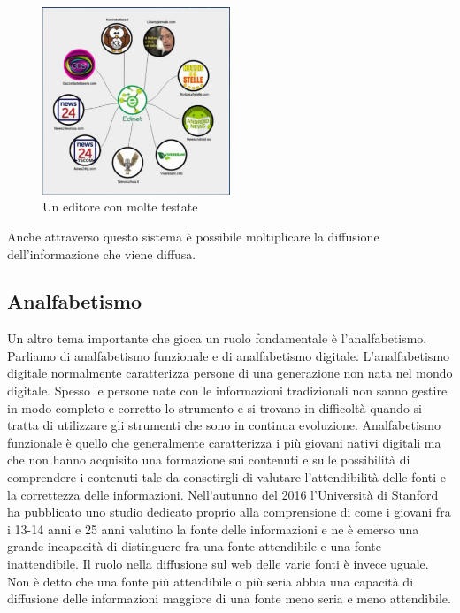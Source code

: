 \begin{figure}[h]
    \centering
    \includegraphics[width=0.5\textwidth]{images/10_lez_fig_01.jpg}
    \caption{Un editore con molte testate}
    \label{fig:editore_testate}
\end{figure}

Anche attraverso questo sistema è possibile moltiplicare la diffusione dell'informazione che viene diffusa. 

\subsection{Analfabetismo}

Un altro tema importante che gioca un ruolo fondamentale è l'analfabetismo. Parliamo di analfabetismo funzionale e di analfabetismo digitale. 
L'analfabetismo digitale normalmente caratterizza persone di una generazione non nata nel mondo digitale. Spesso le persone nate con le informazioni tradizionali non sanno gestire in modo completo e corretto lo strumento e si trovano in difficoltà quando si tratta di utilizzare gli strumenti che sono in continua evoluzione. 
Analfabetismo funzionale è quello che generalmente caratterizza i più giovani nativi digitali ma che non hanno acquisito una formazione sui contenuti e sulle possibilità di comprendere i contenuti tale da consetirgli di valutare l'attendibilità delle fonti e la correttezza delle informazioni.
Nell'autunno del 2016 l'Università di Stanford ha pubblicato uno studio dedicato proprio alla comprensione di come i giovani fra i 13-14 anni e 25 anni valutino la fonte delle informazioni e ne è emerso una grande incapacità di distinguere fra una fonte attendibile e una fonte inattendibile. 
Il ruolo nella diffusione sul web delle varie fonti è invece uguale. Non è detto che una fonte più attendibile o più seria abbia una capacità di diffusione delle informazioni maggiore di una fonte meno seria e meno attendibile. 
